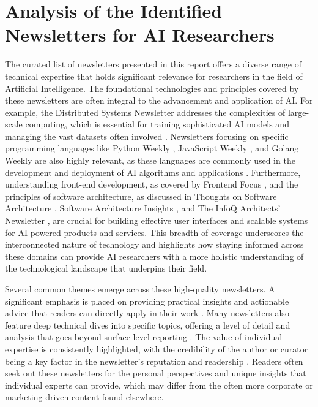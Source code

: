 \documentclass[11pt]{article}
\begin{document}
\section{Analysis of the Identified Newsletters for AI Researchers}
The curated list of newsletters presented in this report offers a diverse range of technical expertise that holds significant relevance for researchers in the field of Artificial Intelligence. The foundational technologies and principles covered by these newsletters are often integral to the advancement and application of AI. For example, the Distributed Systems Newsletter \citep{shekhar2025distributedsystems} addresses the complexities of large-scale computing, which is essential for training sophisticated AI models and managing the vast datasets often involved \citep{shekhar2019intro}. Newsletters focusing on specific programming languages like Python Weekly \citep{pythonweekly2025main}, JavaScript Weekly \citep{javascriptweekly2025}, and Golang Weekly \citep{golangweekly2025issue} are also highly relevant, as these languages are commonly used in the development and deployment of AI algorithms and applications \citep{wikipedia2025go}. Furthermore, understanding front-end development, as covered by Frontend Focus \citep{frontendfocus2025issue}, and the principles of software architecture, as discussed in Thoughts on Software Architecture \citep{niklas2025substack}, Software Architecture Insights \citep{atchison2025softwareinsights}, and The InfoQ Architects' Newsletter \citep{infoq2025newsletter}, are crucial for building effective user interfaces and scalable systems for AI-powered products and services. This breadth of coverage underscores the interconnected nature of technology and highlights how staying informed across these domains can provide AI researchers with a more holistic understanding of the technological landscape that underpins their field.

Several common themes emerge across these high-quality newsletters. A significant emphasis is placed on providing practical insights and actionable advice that readers can directly apply in their work \citep{orosz2025jellypod}. Many newsletters also feature deep technical dives into specific topics, offering a level of detail and analysis that goes beyond surface-level reporting \citep{orosz2025jellypod}. The value of individual expertise is consistently highlighted, with the credibility of the author or curator being a key factor in the newsletter's reputation and readership \citep{favikon2025orosz}. Readers often seek out these newsletters for the personal perspectives and unique insights that individual experts can provide, which may differ from the often more corporate or marketing-driven content found elsewhere.
\end{document}
